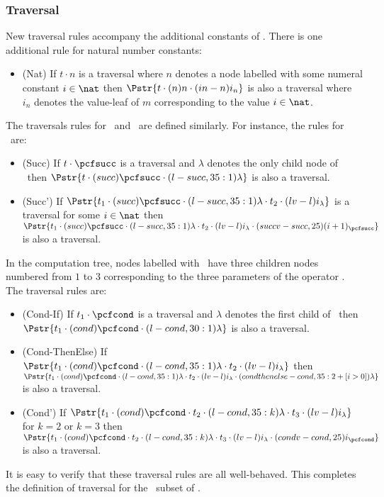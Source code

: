 \subsubsection{Traversal}

New traversal rules accompany the additional constants of \ialgol.
There is one additional rule for natural number constants:
\begin{itemize}
\item (Nat) If $t \cdot n$ is a traversal where $n$ denotes a node labelled with some numeral constant $i\in \nat$ then
            $\Pstr{t \cdot (n){n} \cdot (in-n){i_n}}$
            is also a traversal where $i_n$ denotes the value-leaf of $m$ corresponding to the value $i\in \nat$.
\end{itemize}

\noindent The traversals rules for \pcfpred\ and \pcfsucc\ are
defined similarly. For instance, the rules for \pcfsucc\ are:
\begin{itemize}
\item (Succ) If $t \cdot \pcfsucc$ is a traversal and $\lambda$ denotes the only child node of \pcfsucc\ then
$\Pstr{t \cdot (succ){\pcfsucc} \cdot (l-succ,35:1){\lambda}}$ is also a traversal.

\item (Succ') If
$\Pstr{ t_1 \cdot (succ){\pcfsucc} \cdot (l-succ,35:1){\lambda} \cdot t_2
\cdot (lv-l){i_{\lambda}}} $ is a traversal for some
$i \in \nat$ then $\Pstr{t_1 \cdot (succ){\pcfsucc} \cdot
(l-succ,35:1){\lambda} \cdot t_2 \cdot (lv-l){i_{\lambda}} \cdot
(succv-succ,25){(i+1)_{\pcfsucc}}}$ is also a traversal.
\end{itemize}

\noindent In the computation tree, nodes labelled with \pcfcond\
have three children nodes numbered from $1$ to $3$ corresponding to
the three parameters of the operator \pcfcond. The traversal rules
are:
\begin{itemize}
\item (Cond-If) If $t_1 \cdot \pcfcond$ is a traversal and $\lambda$ denotes the first child of \pcfcond\ then
$\Pstr{ t_1 \cdot (cond){{\pcfcond}} \cdot (l-cond,30:1){\lambda}}$
 is also a traversal.

\item (Cond-ThenElse) If
$\Pstr{t_1 \cdot (cond){\pcfcond} \cdot (l-cond,35:1){\lambda} \cdot t_2
\cdot (lv-l){i_{\lambda}}} $
then $\Pstr{t_1 \cdot
(cond){\pcfcond} \cdot (l-cond,35:1){\lambda} \cdot t_2 \cdot
(lv-l){i_{\lambda}} \cdot (condthenelse-cond,35:{2+[i>0]}){\lambda} }
$
is also a traversal.



\item (Cond') If
$\Pstr{t_1 \cdot (cond){\pcfcond} \cdot t_2 \cdot (l-cond,35:k){\lambda}
\cdot t_3 \cdot (lv-l){i_{\lambda}}}$
 for $k=2$ or $k=3$ then  $\Pstr{ t_1 \cdot
(cond){\pcfcond} \cdot t_2 \cdot (l-cond,35:k){\lambda} \cdot t_3
\cdot (lv-l){i_{\lambda}} \cdot (condv-cond,25){i_{\pcfcond}}}$
 is also a traversal.
\end{itemize}
It is easy to verify that these traversal rules are all
well-behaved. This completes the definition of traversal for the
\pcf\ subset of \ialgol.

